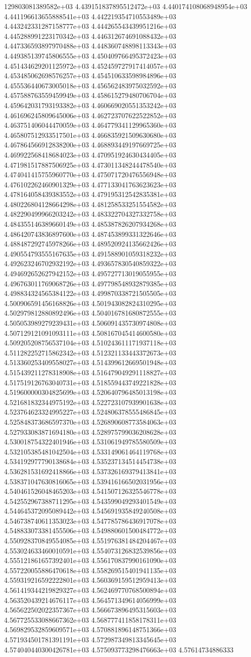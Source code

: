 129803081389582e+03	4.439151837895512472e+03	4.440174108068948954e+03	4.441196613655888541e+03	4.442219354710553489e+03	4.443242331287158777e+03	4.444265543439951216e+03	4.445288991223170342e+03	4.446312674691088432e+03	4.447336593897970488e+03	4.448360748898113343e+03	4.449385139745806555e+03	4.450409766495372423e+03	4.451434629201125972e+03	4.452459727917414057e+03	4.453485062698576257e+03	4.454510633598984896e+03	4.455536440673005018e+03	4.456562483975032592e+03	4.457588763559459949e+03	4.458615279480706704e+03	4.459642031793193382e+03	4.460669020551353242e+03	4.461696245809645006e+03	4.462723707622522852e+03	4.463751406044470059e+03	4.464779341129965360e+03	4.465807512933517501e+03	4.466835921509630680e+03	4.467864566912838200e+03	4.468893449197669725e+03	4.469922568418684023e+03	4.470951924630434405e+03	4.471981517887506925e+03	4.473011348244478540e+03	4.474041415755960770e+03	4.475071720476556948e+03	4.476102262460901329e+03	4.477133041763623623e+03	4.478164058439383552e+03	4.479195312542835381e+03	4.480226804128664298e+03	4.481258533251554582e+03	4.482290499966203242e+03	4.483322704327332758e+03	4.484355146389660149e+03	4.485387826207934268e+03	4.486420743836897600e+03	4.487453899331322646e+03	4.488487292745978266e+03	4.489520924135662426e+03	4.490554793555167635e+03	4.491588901059318232e+03	4.492623246702932192e+03	4.493657830540859322e+03	4.494692652627942152e+03	4.495727713019055955e+03	4.496763011769068726e+03	4.497798548932879385e+03	4.498834324565384122e+03	4.499870338721505505e+03	4.500906591456168826e+03	4.501943082824310295e+03	4.502979812880892496e+03	4.504016781680872555e+03	4.505053989279239431e+03	4.506091435730974808e+03	4.507129121091093111e+03	4.508167045414600580e+03	4.509205208756537104e+03	4.510243611171937118e+03	4.511282252715862342e+03	4.512321133443372673e+03	4.513360253409558027e+03	4.514399612669501948e+03	4.515439211278318908e+03	4.516479049291118827e+03	4.517519126763040731e+03	4.518559443749221828e+03	4.519600000304825699e+03	4.520640796485013198e+03	4.521681832344975192e+03	4.522723107939901638e+03	4.523764623324995227e+03	4.524806378555486845e+03	4.525848373686597370e+03	4.526890608773584063e+03	4.527933083871694180e+03	4.528975799036208628e+03	4.530018754322401946e+03	4.531061949785580509e+03	4.532105385481042504e+03	4.533149061464119768e+03	4.534192977790138684e+03	4.535237134514454738e+03	4.536281531692418866e+03	4.537326169379413841e+03	4.538371047630816065e+03	4.539416166502031956e+03	4.540461526048465203e+03	4.541507126325546778e+03	4.542552967388711295e+03	4.543599049293401549e+03	4.544645372095089442e+03	4.545691935849240508e+03	4.546738740611353023e+03	4.547785786436917078e+03	4.548833073381455506e+03	4.549880601500484772e+03	4.550928370849554085e+03	4.551976381484204467e+03	4.553024633460010591e+03	4.554073126832539856e+03	4.555121861657392401e+03	4.556170837990161090e+03	4.557220055886470618e+03	4.558269515401941135e+03	4.559319216592222801e+03	4.560369159512959413e+03	4.561419344219829327e+03	4.562469770768500894e+03	4.563520439214676117e+03	4.564571349614056999e+03	4.565622502022357367e+03	4.566673896495315603e+03	4.567725533088667362e+03	4.568777411858178311e+03	4.569829532859609571e+03	4.570881896148751366e+03	4.571934501781391191e+03	4.572987349813345645e+03	4.574040440300426781e+03	4.575093773298476663e+03	4.57614734886333